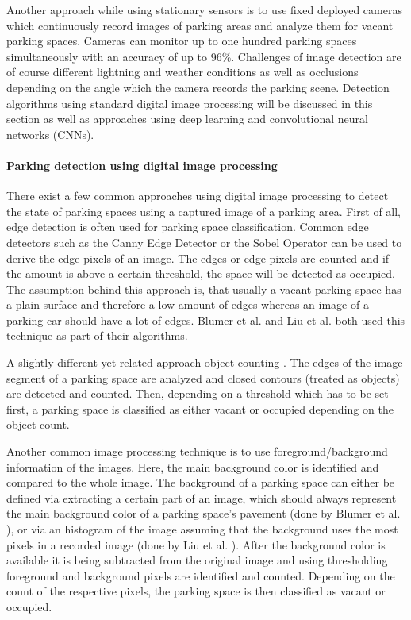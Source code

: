 Another approach while using stationary sensors is to use fixed deployed cameras which continuously record images of parking areas and analyze them for vacant parking spaces. Cameras can monitor up to one hundred parking spaces simultaneously with an accuracy of up to 96\%. Challenges of image detection are of course different lightning and weather conditions as well as occlusions depending on the angle which the camera records the parking scene. Detection algorithms using standard digital image processing will be discussed in this section as well as approaches using deep learning and convolutional neural networks (CNNs).


\paragraph{Parking detection using digital image processing}

There exist a few common approaches using digital image processing to detect the state of parking spaces using a captured image of a parking area. First of all, edge detection is often used for parking space classification. Common edge detectors such as the Canny Edge Detector \cite{Canny1986} or the Sobel Operator \cite{Sobel} can be used to derive the edge pixels of an image. The edges or edge pixels are counted and if the amount is above a certain threshold, the space will be detected as occupied. The assumption behind this approach is, that usually a vacant parking space has a plain surface and therefore a low amount of edges whereas an image of a parking car should have a lot of edges. Blumer et al. \cite{Blumer2012} and Liu et al. \cite{stationary_camera_sensing} both used this technique as part of their algorithms.

A slightly different yet related approach object counting \cite{stationary_camera_sensing}. The edges of the image segment of a parking space are analyzed and closed contours (treated as objects) are detected and counted. Then, depending on a threshold which has to be set first, a parking space is classified as either vacant or occupied depending on the object count.

Another common image processing technique is to use foreground/background information of the images. Here, the main background color is identified and compared to the whole image. The background of a parking space can either be defined via extracting a certain part of an image, which should always represent the main background color of a parking space's pavement (done by Blumer et al. \cite{Blumer2012}), or via an histogram of the image assuming that the background uses the most pixels in a recorded image (done by Liu et al. \cite{stationary_camera_sensing}). After the background color is available it is being subtracted from the original image and using thresholding foreground and background pixels are identified and counted. Depending on the count of the respective pixels, the parking space is then classified as vacant or occupied.

